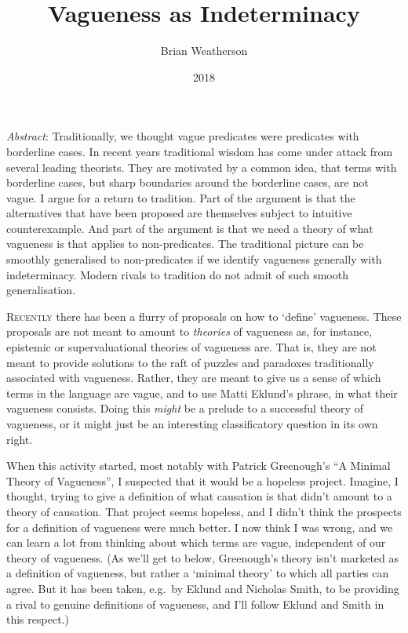 \documentclass[
  11pt,
  letterpaper,
  DIV=11,
  numbers=noendperiod,
  twoside]{scrartcl}
\title{Vagueness as Indeterminacy}
\author{Brian Weatherson}
\date{2018}
\renewenvironment{abstract}
 {\vspace{-1.25cm}
 \quotation\small\noindent\emph{Abstract}:}
 {\endquotation}
\renewenvironment{abstract}
 {\quotation\small\noindent\emph{Abstract}:}
 {\endquotation\vspace{-0.02cm}}
\begin{document}
\maketitle
\begin{abstract}
Traditionally, we thought vague predicates were predicates with
borderline cases. In recent years traditional wisdom has come under
attack from several leading theorists. They are motivated by a common
idea, that terms with borderline cases, but sharp boundaries around the
borderline cases, are not vague. I argue for a return to tradition. Part
of the argument is that the alternatives that have been proposed are
themselves subject to intuitive counterexample. And part of the argument
is that we need a theory of what vagueness is that applies to
non-predicates. The traditional picture can be smoothly generalised to
non-predicates if we identify vagueness generally with indeterminacy.
Modern rivals to tradition do not admit of such smooth generalisation.
\end{abstract}


\lettrine{R}{ecently} there has been a flurry of proposals on how to
`define' vagueness. These proposals are not meant to amount to
\emph{theories} of vagueness as, for instance, epistemic or
supervaluational theories of vagueness are. That is, they are not meant
to provide solutions to the raft of puzzles and paradoxes traditionally
associated with vagueness. Rather, they are meant to give us a sense of
which terms in the language are vague, and to use Matti Eklund's phrase,
in what their vagueness consists. Doing this \emph{might} be a prelude
to a successful theory of vagueness, or it might just be an interesting
classificatory question in its own right.

When this activity started, most notably with Patrick Greenough's ``A
Minimal Theory of Vagueness'', I suspected that it would be a hopeless
project. Imagine, I thought, trying to give a definition of what
causation is that didn't amount to a theory of causation. That project
seems hopeless, and I didn't think the prospects for a definition of
vagueness were much better. I now think I was wrong, and we can learn a
lot from thinking about which terms are vague, independent of our theory
of vagueness. (As we'll get to below, Greenough's theory isn't marketed
as a definition of vagueness, but rather a `minimal theory' to which all
parties can agree. But it has been taken, e.g.~by Eklund and Nicholas
Smith, to be providing a rival to genuine definitions of vagueness, and
I'll follow Eklund and Smith in this respect.)
\end{document}
